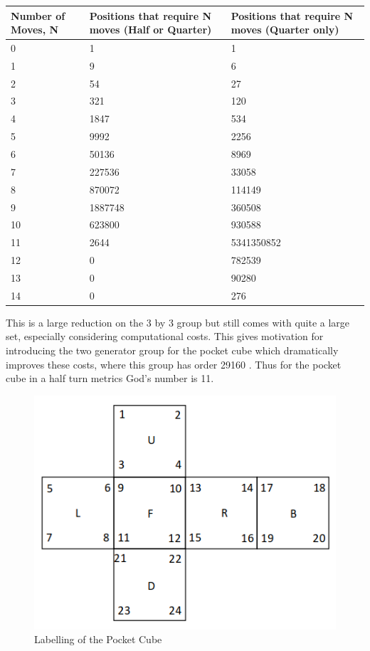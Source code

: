 \documentclass{article}
\begin{document}
\begin{center}
\label{:thistletab}
    \begin{tabular}{ | p{3cm} | p{6cm}| p{6cm} |}
    \hline
    Number of Moves, N  & Positions that require N moves (Half or Quarter) & Positions that require N moves (Quarter only) \\ \hline
     0 & 1 & 1\\ \hline
     1 & 9 & 6\\ \hline
     2 & 54 & 27\\ \hline
     3 & 321 & 120\\ \hline
     4 & 1847 & 534\\ \hline
     5 & 9992 & 2256\\ \hline
     6 & 50136 & 8969\\ \hline
     7 & 227536 & 33058\\ \hline
     8 & 870072 & 114149\\ \hline
     9 & 1887748 & 360508\\ \hline
     10 & 623800 & 930588\\ \hline
     11 & 2644 & 5341350852\\ \hline
     12 & 0 & 782539\\ \hline
     13 & 0 & 90280\\ \hline
     14 & 0 & 276\\ \hline
    \end{tabular}
\end{center}

This is a large reduction on the 3 by 3 group but still comes with quite a large set, especially considering computational costs. This gives motivation for introducing the two generator group for the pocket cube which dramatically improves these costs, where this group has order 29160 \cite{bandelow2012inside}. Thus for the pocket cube in a half turn metrics God's number is 11.

\begin{figure}[h]
\includegraphics[scale=.5]{2by2.png}
\caption{Labelling of the Pocket Cube}
\label{fig:2labelling}
\end{figure}\paragraph{}
\newpage
\end{document}
